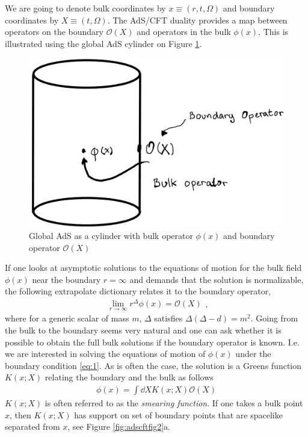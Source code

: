 \documentclass[letter,12pt]{article}
\newcommand{\BO}{\mathcal{O}}
\newcommand{\OO}{\mathcal{O}}
\begin{document}
We are going to denote bulk coordinates by $x\equiv (r,t,\Omega)$ and boundary coordinates by $X\equiv (t,\Omega)$. The AdS/CFT duality provides a map between operators on the boundary $\OO(X)$ and operators in the bulk $\phi(x)$. This is illustrated using the global AdS cylinder on Figure \ref{fig:adscftfig1}.
\begin{figure}[]
	\centering
	\includegraphics[width=0.6\linewidth]{ADS_CFT_Fig1}
	\caption{Global AdS as a cylinder with bulk operator $\phi(x)$ and boundary operator $\OO(X)$}
	\label{fig:adscftfig1}
\end{figure}
If one looks at asymptotic solutions to the equations of motion for the bulk field $\phi(x)$ near the boundary $r=\infty$ and demands that the solution is normalizable, the following extrapolate dictionary relates it to the boundary operator,
\begin{equation}
	\begin{aligned}
		\lim_{r\to \infty}r^{\Delta}\phi(x)=\BO(X)	\end{aligned}, \label{eq:1}
\end{equation}
where for a generic scalar of mass $m$, $\Delta$ satisfies $\Delta(\Delta-d)=m^2$. Going from the bulk to the boundary seems very natural and one can ask whether it is possible to obtain the full bulk solutions if the boundary operator is known. I.e. we are interested in solving the equations of motion of $\phi(x)$ under the boundary condition \eqref{eq:1}. 
As is often the case, the solution is a Greens function $ K(x;X)$ relating the boundary and the bulk as follows
\begin{equation}
	\begin{aligned}
		\phi(x)=\int\dd X K(x;X)\BO(X) \label{eq:2}
	\end{aligned}
\end{equation}
$ K(x;X)$ is often referred to as the \textit{smearing function}. If one takes a bulk point $x$, then $K(x;X)$ has support on set of boundary points that are spacelike separated from $x$, see Figure \ref{fig:adscftfig2}a. 
\end{document}

